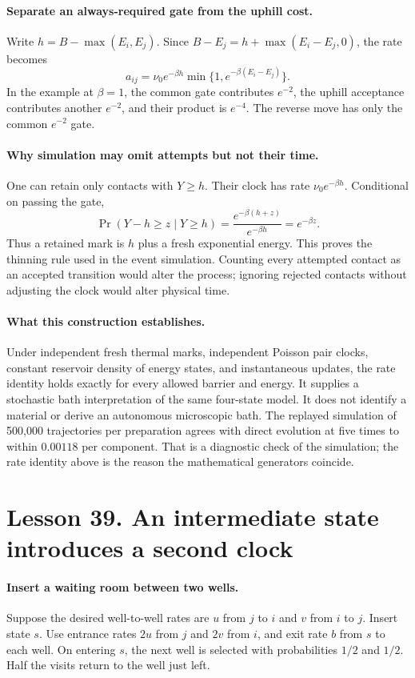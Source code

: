 \paragraph{Separate an always-required gate from the uphill cost.}
Write $h=B-\max(E_i,E_j)$. Since
$B-E_j=h+\max(E_i-E_j,0)$, the rate becomes
\[
 a_{ij}=\nu_0e^{-\beta h}\min\{1,e^{-\beta(E_i-E_j)}\}.
\]
In the example at $\beta=1$, the common gate contributes $e^{-2}$,
the uphill acceptance contributes another $e^{-2}$, and their product is
$e^{-4}$. The reverse move has only the common $e^{-2}$ gate.

\paragraph{Why simulation may omit attempts but not their time.}
One can retain only contacts with $Y\geq h$. Their clock has rate
$\nu_0e^{-\beta h}$. Conditional on passing the gate,
\[
 \Pr(Y-h\geq z\mid Y\geq h)
 =\frac{e^{-\beta(h+z)}}{e^{-\beta h}}=e^{-\beta z}.
\]
Thus a retained mark is $h$ plus a fresh exponential energy. This proves
the thinning rule used in the event simulation. Counting every attempted
contact as an accepted transition would alter the process; ignoring
rejected contacts without adjusting the clock would alter physical time.

\paragraph{What this construction establishes.}
Under independent fresh thermal marks, independent Poisson pair clocks,
constant reservoir density of energy states, and instantaneous updates,
the rate identity holds exactly for every allowed barrier and energy.
It supplies a stochastic bath interpretation of the same four-state model.
It does not identify a material or derive an autonomous microscopic bath.
The replayed simulation of 500,000 trajectories per preparation agrees
with direct evolution at five times to within $0.00118$ per component.
That is a diagnostic check of the simulation; the rate identity above is
the reason the mathematical generators coincide.

\section*{Lesson 39. An intermediate state introduces a second clock}
\paragraph{Insert a waiting room between two wells.}
Suppose the desired well-to-well rates are $u$ from $j$ to $i$ and $v$
from $i$ to $j$. Insert state $s$. Use entrance rates $2u$ from $j$
and $2v$ from $i$, and exit rate $b$ from $s$ to each well. On entering
$s$, the next well is selected with probabilities $1/2$ and $1/2$.
Half the visits return to the well just left.

